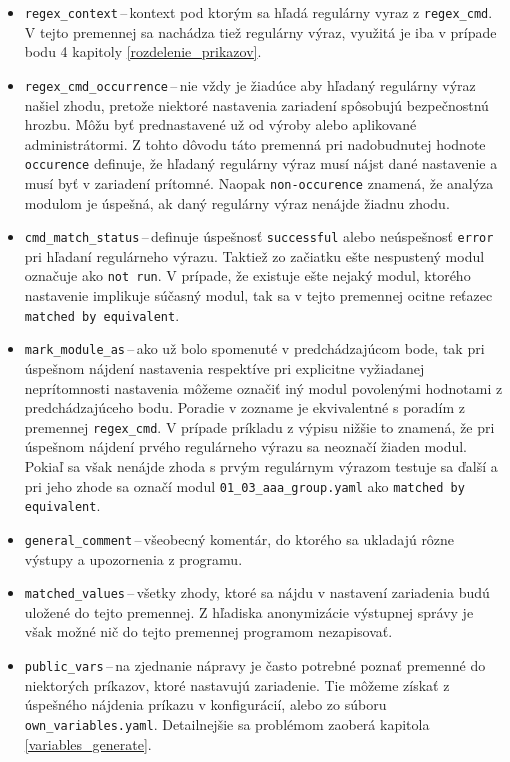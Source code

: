 \begin{itemize}
	\item \texttt{regex\_context}\,--\,kontext pod ktorým sa hľadá regulárny vyraz z \texttt{regex\_cmd}. V tejto premennej sa nachádza tiež regulárny výraz, využitá je iba v prípade bodu 4 kapitoly \ref{rozdelenie_prikazov}.
	\item \texttt{regex\_cmd\_occurrence}\,--\,nie vždy je žiadúce aby hľadaný regulárny výraz našiel zhodu, pretože niektoré nastavenia zariadení spôsobujú bezpečnostnú hrozbu. Môžu byť prednastavené už od výroby alebo aplikované administrátormi. Z tohto dôvodu táto premenná pri nadobudnutej hodnote \texttt{occurence} definuje, že hľadaný regulárny výraz musí nájst dané nastavenie a musí byť v zariadení prítomné. Naopak \texttt{non-occurence} znamená, že analýza modulom je úspešná, ak daný regulárny výraz nenájde žiadnu zhodu. 
	\item \texttt{cmd\_match\_status}\,--\,definuje úspešnosť \texttt{successful} alebo neúspešnosť \texttt{error} pri hľadaní regulárneho výrazu. Taktiež zo začiatku ešte nespustený modul označuje ako \texttt{not run}. V prípade, že existuje ešte nejaký modul, ktorého nastavenie implikuje súčasný modul, tak sa v tejto premennej ocitne reťazec \texttt{matched by equivalent}.
	\item \texttt{mark\_module\_as}\,--\,ako už bolo spomenuté v predchádzajúcom bode, tak pri úspešnom nájdení nastavenia respektíve pri explicitne vyžiadanej neprítomnosti nastavenia môžeme označiť iný modul povolenými hodnotami z predchádzajúceho bodu. Poradie v zozname je ekvivalentné  s poradím z premennej \texttt{regex\_cmd}. V prípade príkladu z výpisu nižšie to znamená, že pri úspešnom nájdení prvého regulárneho výrazu sa neoznačí žiaden modul. Pokiaľ sa však nenájde zhoda s prvým regulárnym výrazom testuje sa ďalší a pri jeho zhode sa označí modul \texttt{01\_03\_aaa\_group.yaml} ako \texttt{matched by equivalent}.
	\item \texttt{general\_comment}\,--\,všeobecný komentár, do ktorého sa ukladajú rôzne výstupy a upozornenia z programu.
	\item \texttt{matched\_values}\,--\,všetky zhody, ktoré sa nájdu v nastavení zariadenia budú uložené do tejto premennej. Z hľadiska anonymizácie výstupnej správy je však možné nič do tejto premennej programom nezapisovať.
	\item \texttt{public\_vars}\,--\,na zjednanie nápravy je často potrebné poznať premenné do niektorých príkazov, ktoré nastavujú zariadenie. Tie môžeme získať z úspešného nájdenia príkazu v konfigurácií, alebo zo súboru \texttt{own\_variables.yaml}. Detailnejšie sa problémom zaoberá kapitola \ref{variables_generate}.

\end{itemize}

